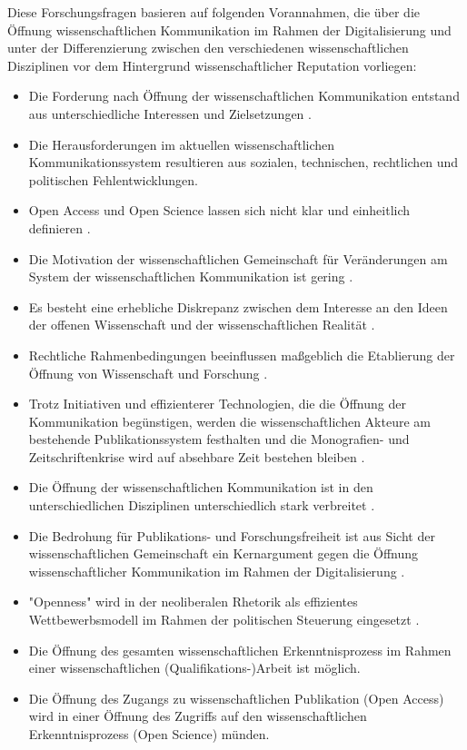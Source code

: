 Diese Forschungsfragen basieren auf folgenden Vorannahmen, die über die Öffnung wissenschaftlichen Kommunikation im Rahmen der Digitalisierung und unter der Differenzierung zwischen den verschiedenen wissenschaftlichen Disziplinen vor dem Hintergrund wissenschaftlicher Reputation vorliegen:
\begin{itemize}
\item Die Forderung nach Öffnung der wissenschaftlichen Kommunikation entstand aus unterschiedliche Interessen und Zielsetzungen \cite{suchen-Hoffmann-Zugang-undVerwertung-oeffentlicher-Informationen}.
\item Die Herausforderungen im aktuellen wissenschaftlichen Kommunikationssystem resultieren aus sozialen, technischen, rechtlichen und politischen Fehlentwicklungen.
\item Open Access und Open Science lassen sich nicht klar und einheitlich definieren \cite{naeder_2010_open}.
\item Die Motivation der wissenschaftlichen Gemeinschaft für Veränderungen am System der wissenschaftlichen Kommunikation ist gering \cite{hagner_2015_sache_buches}.
\item Es besteht eine erhebliche Diskrepanz zwischen dem Interesse an den Ideen der offenen Wissenschaft und der wissenschaftlichen Realität \cite{Scheliga_2014}.
\item Rechtliche Rahmenbedingungen beeinflussen maßgeblich die Etablierung der Öffnung von Wissenschaft und Forschung \cite[:211]{Fehling_2014}.
\item Trotz Initiativen und effizienterer Technologien, die die Öffnung der Kommunikation begünstigen, werden die wissenschaftlichen Akteure am bestehende Publikationssystem festhalten und die Monografien- und Zeitschriftenkrise wird auf absehbare Zeit bestehen bleiben \cite{Parks_2002_acadamic_faust} \cite{Goetting_2015}.
\item Die Öffnung der wissenschaftlichen Kommunikation ist in den unterschiedlichen Disziplinen unterschiedlich stark verbreitet \cite{EuropeanCommission_sciencepub_2006}.
\item Die Bedrohung für Publikations- und Forschungsfreiheit ist aus Sicht der wissenschaftlichen Gemeinschaft ein Kernargument gegen die Öffnung wissenschaftlicher Kommunikation im Rahmen der Digitalisierung \cite{siehe_unten}.
\item "Openness" wird in der neoliberalen Rhetorik als effizientes Wettbewerbsmodell im Rahmen der  politischen Steuerung eingesetzt \cite{tkacz_2012_open}.
\item Die Öffnung des gesamten wissenschaftlichen Erkenntnisprozess im Rahmen einer wissenschaftlichen (Qualifikations-)Arbeit ist möglich.
\item Die Öffnung des Zugangs zu wissenschaftlichen Publikation (Open Access) wird in einer Öffnung des Zugriffs auf den wissenschaftlichen Erkenntnisprozess (Open Science) münden.
\end{itemize}

